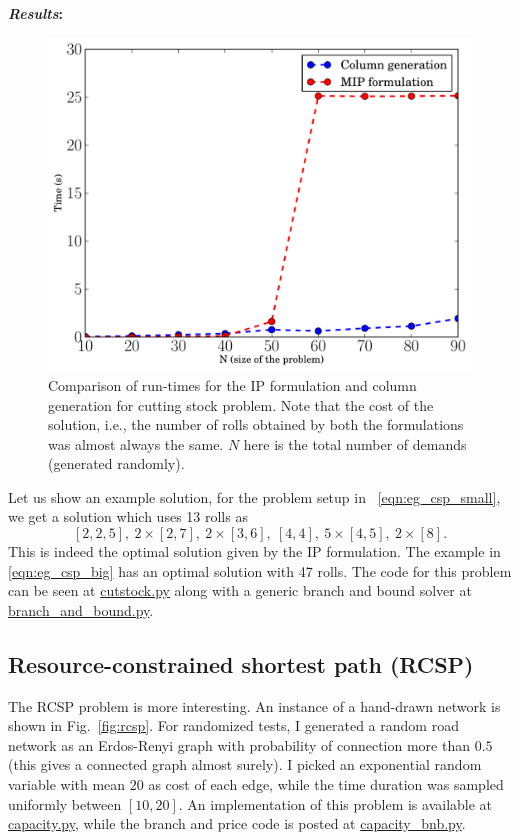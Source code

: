 \documentclass[letterpaper, 10pt, twocolumn, reqno]{amsart}
\begin{document}
\textbf{\emph{Results}:}
\begin{figure}
\centering
\includegraphics[width=0.8 \columnwidth]{colgen_results}
\caption{Comparison of run-times for the IP formulation and column generation for cutting stock problem. Note that the cost of the solution, i.e., the number of
rolls obtained by both the formulations was almost always the same. $N$ here is the total number of demands (generated randomly).}
\label{fig:csp_average_runtime}
\end{figure}

Let us show an example solution, for the problem setup in ~\eqref{eqn:eg_csp_small}, we get a solution which uses 13 rolls as
$$
[2,2,5],\ 2\times [2,7],\ 2 \times [3,6],\ [4,4],\ 5 \times [4,5],\ 2\times [8].
$$
This is indeed the optimal solution given by the IP formulation. The example in \eqref{eqn:eg_csp_big} has an optimal solution with 47 rolls. The code for
this problem can be seen at \href{https://github.com/pratikac/16.763/blob/master/extensions/column_generation/cutstock.py}{cutstock.py}
along with a generic branch and bound solver at
\href{https://github.com/pratikac/16.763/blob/master/extensions/column_generation/branch\_and\_bound.py}{branch\_and\_bound.py}.

\subsection{Resource-constrained shortest path (RCSP)}
\label{ssec:eg_shortest_path}

The RCSP problem is more interesting. An instance of a hand-drawn network is shown in Fig.~\ref{fig:rcsp}. For randomized tests, I generated a random road network as an Erdos-Renyi graph with probability of connection more than $0.5$ (this gives a connected graph almost surely). I picked an exponential random variable with mean $20$ as cost of each edge, while the time duration was sampled uniformly between $[10,20]$. An implementation of this problem is available at \href{https://github.com/pratikac/16.763/blob/master/extensions/column_generation/capacity.py}{capacity.py}, while the branch and price code is posted at \href{https://github.com/pratikac/16.763/blob/master/extensions/column_generation/capacity_bnb.py}{capacity\_bnb.py}.
\end{document}
